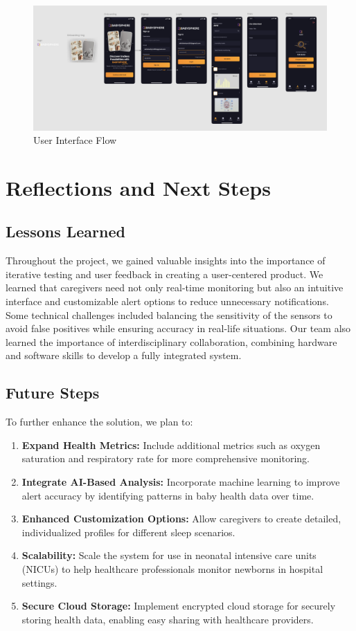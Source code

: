 \documentclass[12pt,a4paper]{report}
\begin{document}
\begin{figure}[H]
  \centering
  \includegraphics[scale=0.32]{./pic/uiflow.png}
  \caption{User Interface Flow}
  \label{fig:uiflow}
\end{figure}

\chapter{Reflections and Next Steps}
\section{Lessons Learned}
Throughout the project, we gained valuable insights into the importance of iterative testing and user feedback in creating a user-centered product. We learned that caregivers need not only real-time monitoring but also an intuitive interface and customizable alert options to reduce unnecessary notifications. Some technical challenges included balancing the sensitivity of the sensors to avoid false positives while ensuring accuracy in real-life situations. Our team also learned the importance of interdisciplinary collaboration, combining hardware and software skills to develop a fully integrated system.

\section{Future Steps}
To further enhance the solution, we plan to:
\begin{enumerate}
  \item \textbf{Expand Health Metrics: }Include additional metrics such as oxygen saturation and respiratory rate for more comprehensive monitoring.
  \item \textbf{Integrate AI-Based Analysis:} Incorporate machine learning to improve alert accuracy by identifying patterns in baby health data over time.
  \item \textbf{Enhanced Customization Options:} Allow caregivers to create detailed, individualized profiles for different sleep scenarios.
  \item \textbf{Scalability:} Scale the system for use in neonatal intensive care units (NICUs) to help healthcare professionals monitor newborns in hospital settings.
  \item \textbf{Secure Cloud Storage:} Implement encrypted cloud storage for securely storing health data, enabling easy sharing with healthcare providers.
\end{enumerate}
\end{document}
